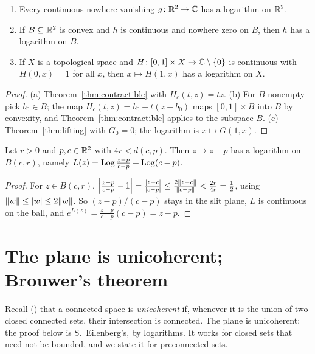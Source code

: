 \begin{corollary}\label{cor:log-exist}
\leavevmode
\begin{enumerate}[label=(\alph*)]
\item Every continuous nowhere vanishing $g\colon\mathbb{R}^2\to\mathbb{C}$ has a logarithm on $\mathbb{R}^2$.
\item If $B\subseteq\mathbb{R}^2$ is convex and $h$ is continuous and nowhere zero on $B$, then $h$ has a
logarithm on $B$.
\item If $X$ is a topological space and $H\colon[0,1]\times X\to\mathbb{C}\setminus\left\{ 0 \right\}$ is continuous with
$H(0,x)=1$ for all $x$, then $x\mapsto H(1,x)$ has a logarithm on $X$.
\end{enumerate}
\end{corollary}

\begin{proof}
(a) Theorem~\ref{thm:contractible} with $H_c(t,z)=tz$. (b) For $B$ nonempty pick $b_0\in B$; the
map $H_c(t,z)=b_0+t(z-b_0)$ maps $[0,1]\times B$ into $B$ by convexity, and
Theorem~\ref{thm:contractible} applies to the subspace $B$. (c) Theorem~\ref{thm:lifting} with
$G_0=0$; the logarithm is $x\mapsto G(1,x)$.
\end{proof}


\begin{lemma}\label{lem:log-ball}
Let $r>0$ and $p,c\in\mathbb{R}^2$ with $4r<d(c,p)$. Then $z\mapsto z-p$ has a logarithm on $B(c,r)$,
namely $L(z)=\operatorname{Log}\frac{z-p}{c-p}+\operatorname{Log}(c-p)$.
\end{lemma}

\begin{proof}
For $z\in B(c,r)$,
$\Big|\frac{z-p}{c-p}-1\Big|=\frac{\left\lvert z-c\right\rvert}{\left\lvert c-p\right\rvert}\le\frac{2\lVert z-c\rVert}{\lVert c-p\rVert}<\frac{2r}{4r}=\frac12$,
using $\lVert w\rVert\le\left\lvert w\right\rvert\le2\lVert w\rVert$. So $(z-p)/(c-p)$ stays in the slit plane, $L$ is continuous on
the ball, and $e^{L(z)}=\frac{z-p}{c-p}(c-p)=z-p$.
\end{proof}


\section{The plane is unicoherent; Brouwer's theorem}

Recall () that a connected space is \emph{unicoherent} if, whenever it is
the union of two closed connected sets, their intersection is connected. The plane is
unicoherent; the proof below is S.~Eilenberg's, by logarithms. It works for closed sets that need
not be bounded, and we state it for preconnected sets.

